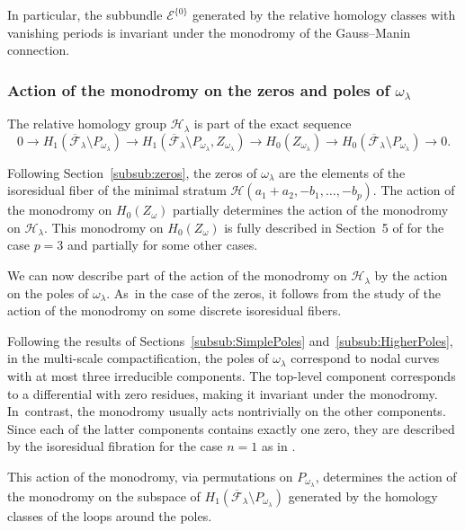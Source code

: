 \documentclass[11pt]{article}
\newcommand\calH{{\mathcal H}}
\theoremstyle{definition}
\begin{document}
In particular, the subbundle $\mathcal{E}^{\lbrace{ 0 \rbrace}}$ generated by the relative homology classes with vanishing periods is invariant under the monodromy of the Gauss--Manin connection.

\subsubsection{Action of the monodromy on the zeros and poles of $\omega_{\lambda}$}\label{subsub:MonodromyZerosPoles}

The relative homology group $\calH_{\lambda}$ is part of the exact sequence
\[
0 \to
H_{1}(\overline{\mathcal{F}}_{\lambda} \setminus P_{\omega_{\lambda}})
\to H_{1}(\overline{\mathcal{F}}_{\lambda} \setminus P_{\omega_{\lambda}}, Z_{\omega_{\lambda}})
\to
H_{0}(Z_{\omega_{\lambda}})
\to
H_{0}(\overline{\mathcal{F}}_{\lambda} \setminus P_{\omega_{\lambda}})
\to 0.
\]

Following Section~\ref{subsub:zeros}, the zeros of $\omega_{\lambda}$ are the elements of the isoresidual fiber of the minimal stratum $\mathcal{H}(a_{1}+a_{2},-b_{1},\dots,-b_{p})$. The action of the monodromy on $H_{0}(Z_{\omega})$ partially determines the action of the monodromy on $\calH_{\lambda}$. This monodromy on $H_{0}(Z_{\omega})$ is fully described in Section~5 of \cite{GeTaIso} for the case $p=3$ and partially for some other cases.

We can now describe part of the action of the monodromy on $\calH_{\lambda}$ by the action on the poles of $\omega_{\lambda}$. As~in the case of the zeros, it follows from the study of the action of the monodromy on some discrete isoresidual fibers.

Following the results of Sections~\ref{subsub:SimplePoles} and~\ref{subsub:HigherPoles}, in the multi-scale compactification, the poles of $\omega_{\lambda}$ correspond to nodal curves with at most three irreducible components. The top-level component corresponds to a differential with zero residues, making it invariant under the monodromy. In~contrast, the monodromy usually acts nontrivially on the other components. Since each of the latter components contains exactly one zero, they are described by the isoresidual fibration for the case $n=1$ as in \cite{GeTaIso}.

This action of the monodromy, via permutations on $P_{\omega_{\lambda}}$, determines the action of the monodromy on the subspace of
$H_{1}(\overline{\mathcal{F}}_{\lambda} \setminus P_{\omega_{\lambda}})$ generated by the homology classes of the loops around the poles.
\end{document}

